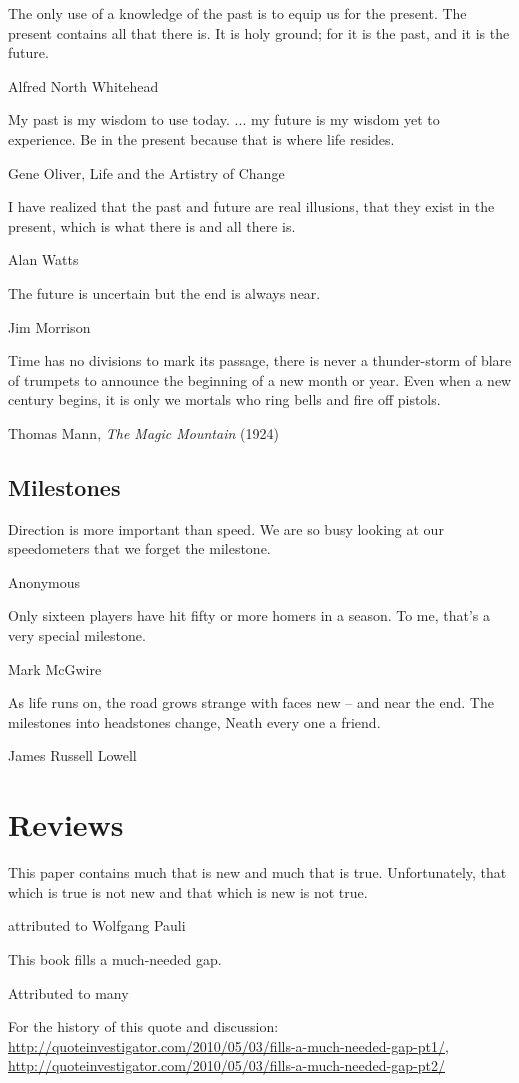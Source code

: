 \epigraph{The only use of a knowledge of the past is to equip us for the present. The present contains all that there is. It is holy ground; for it is the past, and it is the future.}{Alfred North Whitehead} %

\epigraph{My past is my wisdom to use today. ... my future is my wisdom yet to experience. Be in the present because that is where life resides.}{Gene Oliver, Life and the Artistry of Change}

\epigraph{I have realized that the past and future are real illusions, that they exist in the present, which is what there is and all there is.}{Alan Watts}

\epigraph{The future is uncertain but the end is always near.}{Jim Morrison}

\epigraph{Time has no divisions to mark its passage, there is never a thunder-storm of blare of trumpets to announce the beginning of a new month or year. Even when a new century begins, it is only we mortals who ring bells and fire off pistols.}{Thomas Mann, \emph{The Magic Mountain} (1924)}

\subsection{Milestones}

\epigraph{Direction is more important than speed. We are so busy looking at our speedometers that we forget the milestone.}{Anonymous}

\epigraph{Only sixteen players have hit fifty or more homers in a season. To me, that's a very special milestone.}{Mark McGwire}

\epigraph{As life runs on, the road grows strange with faces new -- and near the end. The milestones into headstones change, Neath every one a friend.}{James Russell Lowell}

\section{Reviews}
\epigraph{This paper contains much that is new and much that is true. Unfortunately, that which is true is not new and that which is new is not true.}{attributed to Wolfgang Pauli}

\epigraph{This book fills a much-needed gap.}{Attributed to many}

For the history of this quote and discussion:
\url{http://quoteinvestigator.com/2010/05/03/fills-a-much-needed-gap-pt1/},
\url{http://quoteinvestigator.com/2010/05/03/fills-a-much-needed-gap-pt2/}

